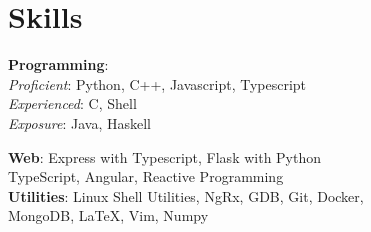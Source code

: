 \section*{\sc Skills}
\vspace{-2mm}
\hrulefill

\textbf{Programming}:\\
\quad \textit{Proficient}: Python, C++, Javascript, Typescript\\
\quad \textit{Experienced}: C, Shell \\
\quad \textit{Exposure}: Java, Haskell

\textbf{Web}:
Express with Typescript, Flask with Python \\
\quad TypeScript, Angular, Reactive Programming\\

\textbf{Utilities}:
Linux Shell Utilities, NgRx, GDB, Git, Docker, \\ \quad MongoDB, \LaTeX, Vim, Numpy
